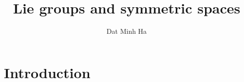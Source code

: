 

\setcounter{section}{-1}





    \title{Lie groups and symmetric spaces}
    
    \author{Dat Minh Ha}
    \maketitle
    
    \begin{abstract}
        
    \end{abstract}
    
    {
      \hypersetup{} 
      \tableofcontents %
    }

    \section{Introduction}
    
    

    

\printbibliography

